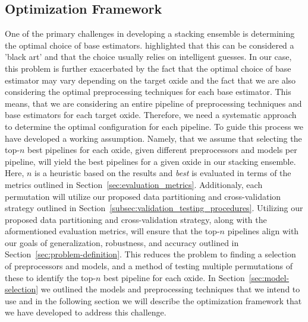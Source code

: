\subsection{Optimization Framework}\label{sec:optimization-framework}
One of the primary challenges in developing a stacking ensemble is determining the optimal choice of base estimators.
\citet{wolpert1992stacked} highlighted that this can be considered a 'black art' and that the choice usually relies on intelligent guesses.
In our case, this problem is further exacerbated by the fact that the optimal choice of base estimator may vary depending on the target oxide and the fact that we are also considering the optimal preprocessing techniques for each base estimator.
This means, that we are considering an entire pipeline of preprocessing techniques and base estimators for each target oxide.
Therefore, we need a systematic approach to determine the optimal configuration for each pipeline.
To guide this process we have developed a working assumption.
Namely, that we assume that selecting the top-$n$ best pipelines for each oxide, given different preprocessors and models per pipeline, will yield the best pipelines for a given oxide in our stacking ensemble.
Here, $n$ is a heuristic based on the results and \textit{best} is evaluated in terms of the metrics outlined in Section~\ref{sec:evaluation_metrics}.
Additionaly, each permutation will utilize our proposed data partitioning and cross-validation strategy outlined in Section~\ref{subsec:validation_testing_procedures}.
Utilizing our proposed data partitioning and cross-validation strategy, along with the aformentioned evaluation metrics, will ensure that the top-$n$ pipelines align with our goals of generalization, robustness, and accuracy outlined in Section~\ref{sec:problem-definition}.
This reduces the problem to finding a selection of preprocessors and models, and a method of testing multiple permutations of these to identify the top-$n$ best pipeline for each oxide.
In Section~\ref{sec:model-selection} we outlined the models and preprocessing techniques that we intend to use and in the following section we will describe the optimization framework that we have developed to address this challenge.

